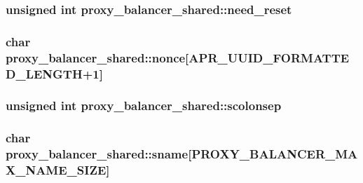 \subsubsection[{\texorpdfstring{need\+\_\+reset}{need_reset}}]{\setlength{\rightskip}{0pt plus 5cm}unsigned {\bf int} proxy\+\_\+balancer\+\_\+shared\+::need\+\_\+reset}\hypertarget{structproxy__balancer__shared_a6c5264857caff7204def0b2984e3b539}{}\label{structproxy__balancer__shared_a6c5264857caff7204def0b2984e3b539}
\subsubsection[{\texorpdfstring{nonce}{nonce}}]{\setlength{\rightskip}{0pt plus 5cm}char proxy\+\_\+balancer\+\_\+shared\+::nonce\mbox{[}{\bf A\+P\+R\+\_\+\+U\+U\+I\+D\+\_\+\+F\+O\+R\+M\+A\+T\+T\+E\+D\+\_\+\+L\+E\+N\+G\+TH}+1\mbox{]}}\hypertarget{structproxy__balancer__shared_a9b5f2f42006d7062ec566776bd7bba04}{}\label{structproxy__balancer__shared_a9b5f2f42006d7062ec566776bd7bba04}
\subsubsection[{\texorpdfstring{scolonsep}{scolonsep}}]{\setlength{\rightskip}{0pt plus 5cm}unsigned {\bf int} proxy\+\_\+balancer\+\_\+shared\+::scolonsep}\hypertarget{structproxy__balancer__shared_a382c089bd5207cbf6f139bfcd91a49a4}{}\label{structproxy__balancer__shared_a382c089bd5207cbf6f139bfcd91a49a4}
\subsubsection[{\texorpdfstring{sname}{sname}}]{\setlength{\rightskip}{0pt plus 5cm}char proxy\+\_\+balancer\+\_\+shared\+::sname\mbox{[}{\bf P\+R\+O\+X\+Y\+\_\+\+B\+A\+L\+A\+N\+C\+E\+R\+\_\+\+M\+A\+X\+\_\+\+N\+A\+M\+E\+\_\+\+S\+I\+ZE}\mbox{]}}\hypertarget{structproxy__balancer__shared_a32c7749ad9d4fe5427aecc4d5744170e}{}\label{structproxy__balancer__shared_a32c7749ad9d4fe5427aecc4d5744170e}
